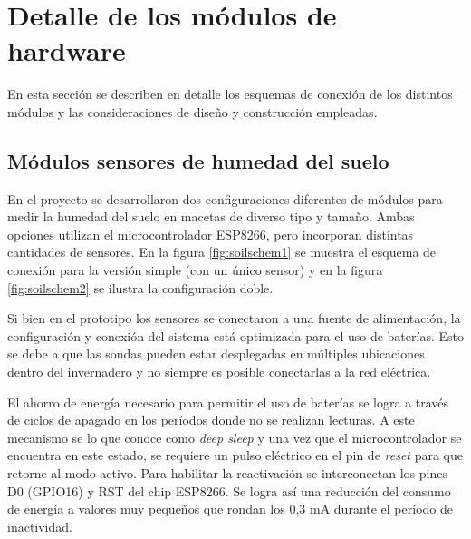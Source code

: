 \section{Detalle de los módulos de hardware}
\label{sec:Módulos de hardware}
En esta sección se describen en detalle los esquemas de conexión de los distintos módulos y las consideraciones de diseño y construcción empleadas. 

\subsection{Módulos sensores de humedad del suelo}
\label{Hardware módulos sensores de humedad del suelo}


En el proyecto se desarrollaron dos configuraciones diferentes de módulos para medir la humedad del suelo en macetas de diverso tipo y tamaño. Ambas opciones utilizan el microcontrolador ESP8266, pero incorporan distintas cantidades de sensores. En la figura \ref{fig:soilschem1} se muestra el esquema de conexión para la versión simple (con un único sensor) y en la figura \ref{fig:soilschem2} se ilustra la configuración doble.

Si bien en el prototipo los sensores se conectaron a una fuente de alimentación, la configuración y conexión del sistema está optimizada para el uso de baterías. Esto se debe a que las sondas pueden estar desplegadas en múltiples ubicaciones dentro del invernadero y no siempre es posible conectarlas a la red eléctrica. 

El ahorro de energía necesario para permitir el uso de  baterías se logra a través de ciclos de apagado en los períodos donde no se realizan lecturas. A este mecanismo se lo que conoce como \textit{deep sleep} y una vez que el microcontrolador se encuentra en este estado, se requiere un pulso eléctrico en el pin de \textit{reset} para que retorne al modo activo. 
Para habilitar la reactivación se interconectan los pines D0 (GPIO16) y RST del chip ESP8266. Se logra así una reducción del consumo de energía a valores muy pequeños que rondan los 0,3 mA durante el período de inactividad.




